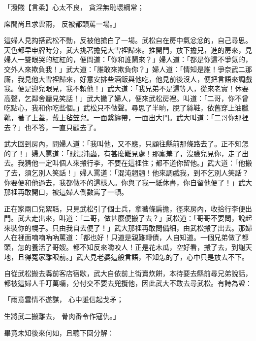 \begin{showcontents}{}
「潑賤【言柔】心太不良，  貪淫無恥壞綱常；

席間尚且求雲雨，  反被都頭罵一場。」

這婦人見抅搭武松不動，反被他搶白了一場。武松自在房中氣忿忿的，自己尋思。天色都早申牌時分，武大挑著擔兒大雪裡歸來。推開門，放下擔兒，進的房來，見婦人一雙眼哭的紅紅的，便問道：「你和誰鬧來？」婦人道：「都是你這不爭氣的，交外人來欺負我！」武大道：「誰敢來欺負你？」婦人道：「情知是誰！爭奈武二那廝，我見他大雪裡歸來，好意安排些酒飯與他吃，他見前後沒人，便把言語來調戲我。便是迎兒眼見，我不賴他！」武大道：「我兄弟不是這等人，從來老實！休要高聲，乞鄰舍聽見笑話！」武大撇了婦人，便來武松房裡。叫道：「二哥，你不曾吃點心，我和你吃些個。」武松只不做聲。尋思了半晌，脫了絲鞋，依舊穿上油臘靴，著了上蓋，戴上毡笠兒。一面繫纏帶，一面出大門。武大叫道：「二哥你那裡去？」也不答，一直只顧去了。

武大回到房內，問婦人道：「我叫他，又不應，只顧往縣前那條路去了。正不知怎的了！」婦人罵道：「賊混沌蟲，有甚麼難見處！那廝羞了，沒臉兒見你，走了出去。我猜他一定叫個人來搬行李，不要在這裡住；都不道你留他。」武大道：「他搬了去，須乞別人笑話！」婦人罵道：「混沌魍魎！他來調戲我，到不乞別人笑話？你要便和他過去，我都做不的這樣人。你與了我一紙休書，你自留他便了！」武大那裡再敢開口，被這婦人倒數罵了一頓。

正在家兩口兒絮聒，只見武松引了個士兵，拿著條扁擔，徑來房內，收拾行李便出門。武大走出來，叫道：「二哥，做甚麼便搬了去？」武松道：「哥哥不要問，說起來裝你的幌子。只由我自去便了！」武大那裡再敢問備細，由武松搬了出去。那婦人在裡面喃喃吶吶罵道：「都也好！只道是親難轉債，人自知道。一個兄弟做了都頭，怎的養活了哥嫂。都不知反來嚼咬人！正是花木瓜，空好看，搬了去，到謝天地，且得冤家離眼前。」武大見老婆這般言語，不知怎的了，心中只是放去不下。

自從武松搬去縣前客店宿歇，武大自依前上街賣炊餅，本待要去縣前尋兄弟說話，都被這婦人千叮萬囑，分付交不要去兜攬他，因此武大不敢去尋武松。有詩為證：

「雨意雲情不遂謀，  心中誰信起戈矛；

生將武二搬離去，  骨肉番令作寇仇。」

畢竟未知後來何如，且聽下回分解：




\end{showcontents}

